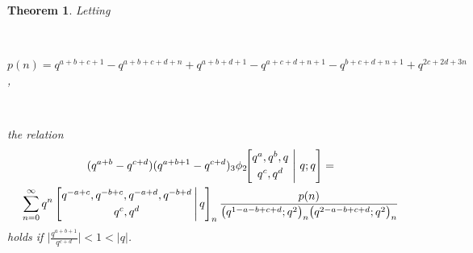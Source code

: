 \documentclass[12pt]{article}
\newtheorem{theorem}{Theorem}
\begin{document}
\begin{theorem}\label{theoremquarter}
 Letting

 \ 
 
\noindent $ p(n) = q^{a+b+c+1}-q^{a+b+c+d+n} + q^{a+b+d+1} -  q^{a+c+d+n+1}-q^{b+c+d+n+1}+q^{2 c+2 d+3 n}$, 

 \ 

\noindent the relation 
\begin{multline*}
 (q^{a+b} - q^{c+d}) (q^{a+b+1} - q^{c+d}) 
 {}_{3}\phi_{2}\!\!\left[ \begin{matrix} 
 q^{a}, q^{b}, q \vspace{1mm}\\ 
 q^{c}, q^{d} \end{matrix} \ \Bigg| \ q; q 
 \right] = \\ 
 \sum_{n=0}^{\infty} q^{n} 
 \left[ \begin{matrix} 
 q^{-a+c}, q^{-b+c}, q^{-a+d}, q^{-b+d} \vspace{1mm} \\ 
 q^{c}, q^{d} \end{matrix} \, \Bigg| \, q \right]_{n} 
 \frac{p(n)}{ 
 \big( q^{1-a-b+c+d};q^2 \big)_{n} \big( q^{2-a-b+c+d};q^2 \big)_{n} }
 \end{multline*}
 holds if $\big| \frac{q^{a + b + 1}}{q^{c + d}} \big| < 1 < |q|$. 
\end{theorem} 
\end{document}
